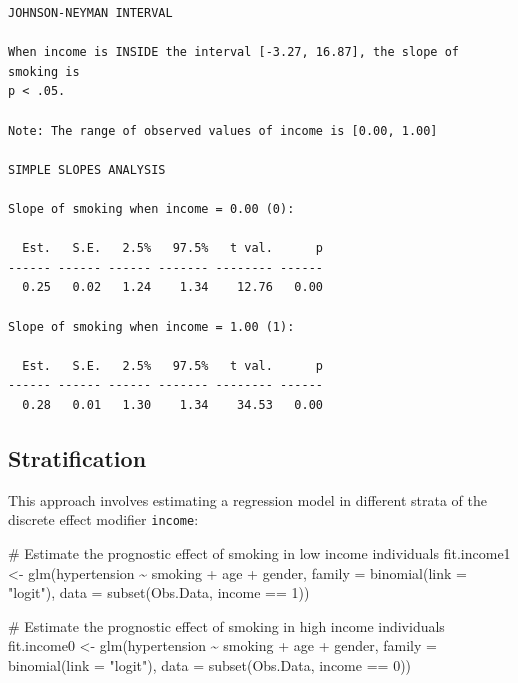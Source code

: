 \documentclass[
  letterpaper,
  DIV=11,
  numbers=noendperiod]{scrreprt}
\newenvironment{Shaded}{\begin{snugshade}}{\end{snugshade}}
\newcommand{\AttributeTok}[1]{\textcolor[rgb]{0.40,0.45,0.13}{#1}}
\newcommand{\CommentTok}[1]{\textcolor[rgb]{0.37,0.37,0.37}{#1}}
\newcommand{\DecValTok}[1]{\textcolor[rgb]{0.68,0.00,0.00}{#1}}
\newcommand{\FunctionTok}[1]{\textcolor[rgb]{0.28,0.35,0.67}{#1}}
\newcommand{\NormalTok}[1]{\textcolor[rgb]{0.00,0.23,0.31}{#1}}
\newcommand{\OtherTok}[1]{\textcolor[rgb]{0.00,0.23,0.31}{#1}}
\newcommand{\SpecialCharTok}[1]{\textcolor[rgb]{0.37,0.37,0.37}{#1}}
\newcommand{\StringTok}[1]{\textcolor[rgb]{0.13,0.47,0.30}{#1}}
\begin{document}
\begin{verbatim}
JOHNSON-NEYMAN INTERVAL 

When income is INSIDE the interval [-3.27, 16.87], the slope of smoking is
p < .05.

Note: The range of observed values of income is [0.00, 1.00]

SIMPLE SLOPES ANALYSIS 

Slope of smoking when income = 0.00 (0): 

  Est.   S.E.   2.5%   97.5%   t val.      p
------ ------ ------ ------- -------- ------
  0.25   0.02   1.24    1.34    12.76   0.00

Slope of smoking when income = 1.00 (1): 

  Est.   S.E.   2.5%   97.5%   t val.      p
------ ------ ------ ------- -------- ------
  0.28   0.01   1.30    1.34    34.53   0.00
\end{verbatim}

\hypertarget{stratification}{%
\subsection{Stratification}\label{stratification}}

This approach involves estimating a regression model in different strata
of the discrete effect modifier \texttt{income}:

\begin{Shaded}
\begin{Highlighting}[]
\CommentTok{\# Estimate the prognostic effect of smoking in low income individuals}
\NormalTok{fit.income1 }\OtherTok{\textless{}{-}} \FunctionTok{glm}\NormalTok{(hypertension }\SpecialCharTok{\textasciitilde{}}\NormalTok{ smoking }\SpecialCharTok{+}\NormalTok{ age }\SpecialCharTok{+}\NormalTok{ gender, }
            \AttributeTok{family =} \FunctionTok{binomial}\NormalTok{(}\AttributeTok{link =} \StringTok{"logit"}\NormalTok{), }
            \AttributeTok{data =} \FunctionTok{subset}\NormalTok{(Obs.Data, income }\SpecialCharTok{==} \DecValTok{1}\NormalTok{))}

\CommentTok{\# Estimate the prognostic effect of smoking in high income individuals}
\NormalTok{fit.income0 }\OtherTok{\textless{}{-}} \FunctionTok{glm}\NormalTok{(hypertension }\SpecialCharTok{\textasciitilde{}}\NormalTok{ smoking }\SpecialCharTok{+}\NormalTok{ age }\SpecialCharTok{+}\NormalTok{ gender, }
            \AttributeTok{family =} \FunctionTok{binomial}\NormalTok{(}\AttributeTok{link =} \StringTok{"logit"}\NormalTok{), }
            \AttributeTok{data =} \FunctionTok{subset}\NormalTok{(Obs.Data, income }\SpecialCharTok{==} \DecValTok{0}\NormalTok{))}
\end{Highlighting}
\end{Shaded}
\end{document}
